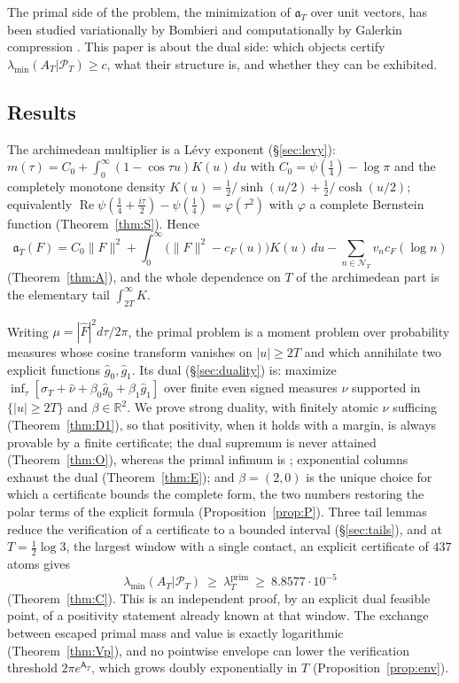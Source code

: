 \documentclass[11pt]{amsart}
\theoremstyle{definition}
\theoremstyle{remark}
\newcommand{\R}{\mathbb R}
\newcommand{\Rel}{\operatorname{Re}}
\newcommand{\PT}{\mathcal P_T}
\newcommand{\lamP}{\lambda^{\mathrm{prim}}_T}
\newcommand{\lamA}{\lambda_{\min}(A_T|\PT)}
\newcommand{\sT}{\sigma_T}
\newcommand{\gh}[1]{\widehat g_{#1}}
\newcommand{\nuh}{\widehat\nu}
\newcommand{\Fh}{\widehat F}
\newcommand{\cF}{c_F}
\newcommand{\NT}{\mathcal N_T}
\newcommand{\Aconst}{\mathsf A_T}
\begin{document}
The primal side of the problem, the minimization of $\mathfrak a_T$ over unit vectors, has been
studied variationally by Bombieri \cite{Bombieri2000} and computationally by Galerkin compression
\cite{Paper42,Zhu2026,Groskin2026}. This paper is about the dual side: which objects certify
$\lamA\ge c$, what their structure is, and whether they can be exhibited.

\subsection{Results}
The archimedean multiplier is a L\'evy exponent (\S\ref{sec:levy}): $m(\tau)=C_0+\int_0^\infty
(1-\cos\tau u)K(u)\,du$ with $C_0=\psi(\frac14)-\log\pi$ and the completely monotone density
$K(u)=\frac12/\sinh(u/2)+\frac12/\cosh(u/2)$; equivalently
$\Rel\psi(\frac14+\frac{i\tau}2)-\psi(\frac14)=\varphi(\tau^2)$ with $\varphi$ a complete Bernstein
function (Theorem~\ref{thm:S}). Hence
\begin{equation}\label{eq:A}
\mathfrak a_T(F)=C_0\|F\|^2+\int_0^\infty\big(\|F\|^2-\cF(u)\big)K(u)\,du-\sum_{n\in\NT}v_n\cF(\log n)
\end{equation}
(Theorem~\ref{thm:A}), and the whole dependence on $T$ of the archimedean part is the elementary tail
$\int_{2T}^\infty K$.

Writing $\mu=|\Fh|^2d\tau/2\pi$, the primal problem is a moment problem over probability measures
whose cosine transform vanishes on $|u|\ge2T$ and which annihilate two explicit functions $\gh0,\gh1$.
Its dual (\S\ref{sec:duality}) is: maximize $\inf_\tau[\sT+\nuh+\beta_0\gh0+\beta_1\gh1]$ over finite
even signed measures $\nu$ supported in $\{|u|\ge2T\}$ and $\beta\in\R^2$. We prove strong duality,
with finitely atomic $\nu$ sufficing (Theorem~\ref{thm:D1}), so that positivity, when it holds with a
margin, is always provable by a finite certificate; the dual supremum is never attained
(Theorem~\ref{thm:O}), whereas the primal infimum is \cite[Thm.~3]{Bombieri2000}; exponential columns
exhaust the dual (Theorem~\ref{thm:E}); and $\beta=(2,0)$ is the unique choice for which a
certificate bounds the complete form, the two numbers restoring the polar terms of the explicit
formula (Proposition~\ref{prop:P}). Three tail lemmas reduce the verification of a certificate to a
bounded interval (\S\ref{sec:tails}), and at $T=\frac12\log3$, the largest window with a single
contact, an explicit certificate of $437$ atoms gives
\[
\lamA\ \ge\ \lamP\ \ge\ 8.8577\cdot10^{-5}
\]
(Theorem~\ref{thm:C}). This is an independent proof, by an explicit dual feasible point, of a
positivity statement already known at that window. The exchange between escaped primal mass and
value is exactly logarithmic (Theorem~\ref{thm:Vp}), and no pointwise envelope can lower the
verification threshold $2\pi e^{\Aconst}$, which grows doubly exponentially in $T$
(Proposition~\ref{prop:env}).
\end{document}

